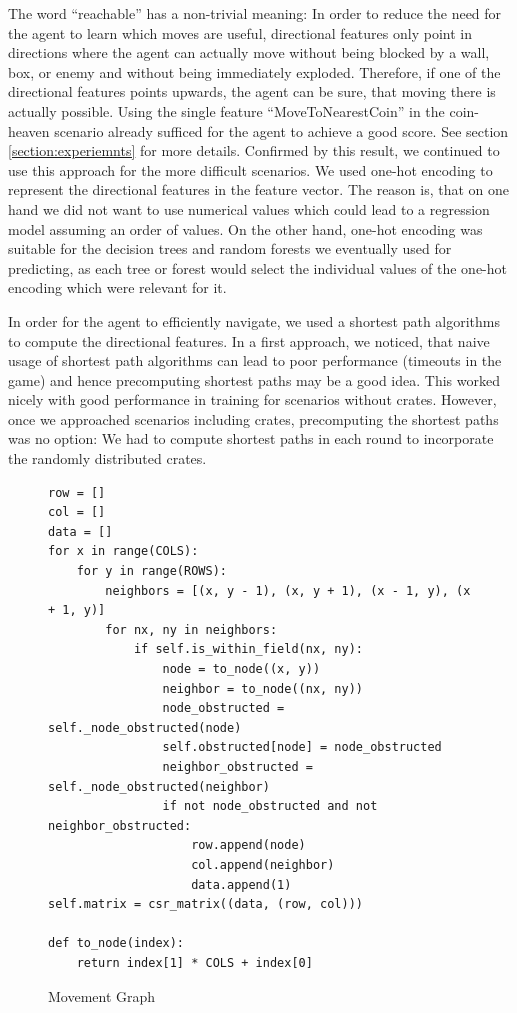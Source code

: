 \documentclass{article}
\begin{document}
The word “reachable” has a non-trivial meaning: In order to reduce the need for the agent to learn which moves are useful, directional features only point in directions where the agent can actually move without being blocked by a wall, box, or enemy and without being immediately exploded. Therefore, if one of the directional features points upwards, the agent can be sure, that moving there is actually possible. Using the single feature “MoveToNearestCoin” in the coin-heaven scenario already sufficed for the agent to achieve a good score. See section \ref{section:experiemnts} for more details. Confirmed by this result, we continued to use this approach for the more difficult scenarios. We used one-hot encoding to represent the directional features in the feature vector. The reason is, that on one hand we did not want to use numerical values which could lead to a regression model assuming an order of values. On the other hand, one-hot encoding was suitable for the decision trees and random forests we eventually used for predicting, as each tree or forest would select the individual values of the one-hot encoding which were relevant for it. 

In order for the agent to efficiently navigate, we used a shortest path algorithms to compute the directional features. In a first approach, we noticed, that naive usage of shortest path algorithms can lead to poor performance (timeouts in the game) and hence precomputing shortest paths may be a good idea. This worked nicely with good performance in training for scenarios without crates. However, once we approached scenarios including crates, precomputing the shortest paths was no option: We had to compute shortest paths in each round to incorporate the randomly distributed crates. 

\begin{figure}[h]
\centering
\begin{verbatim}
row = []
col = []
data = []
for x in range(COLS):
    for y in range(ROWS):
        neighbors = [(x, y - 1), (x, y + 1), (x - 1, y), (x + 1, y)]
        for nx, ny in neighbors:
            if self.is_within_field(nx, ny):
                node = to_node((x, y))
                neighbor = to_node((nx, ny))
                node_obstructed = self._node_obstructed(node)
                self.obstructed[node] = node_obstructed
                neighbor_obstructed = self._node_obstructed(neighbor)
                if not node_obstructed and not neighbor_obstructed:
                    row.append(node)
                    col.append(neighbor)
                    data.append(1)
self.matrix = csr_matrix((data, (row, col)))

def to_node(index):
    return index[1] * COLS + index[0]
\end{verbatim}
\caption{Movement Graph}
\label{code:movement_graph}
\end{figure}
\end{document}
